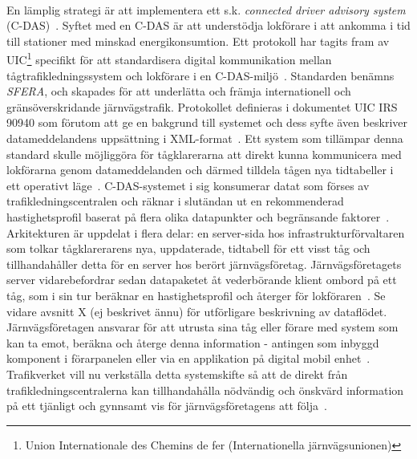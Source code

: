 \paragraph{}
\hspace{-11}En lämplig strategi är att implementera ett s.k. \emph{connected driver advisory system} (C-DAS)~\cite{Angel2020, Joborn2023, Lindmark2022, Ketech2022, Verstappen2022}.
Syftet med en C-DAS är att understödja lokförare i att ankomma i tid till stationer med minskad energikonsumtion\cite{IRS90940}.
Ett protokoll har tagits fram av UIC\footnote{Union Internationale des Chemins de fer (Internationella järnvägsunionen)} specifikt för att standardisera digital kommunikation mellan tågtrafikledningssystem och lokförare i en C-DAS-miljö~\cite{Joborn2023, Olsson2023, Lindmark2022}.
Standarden benämns \emph{SFERA}, och skapades för att underlätta och främja internationell och gränsöverskridande järnvägstrafik\cite{IRS90940}.
Protokollet definieras i dokumentet UIC IRS 90940 som förutom att ge en bakgrund till systemet och dess syfte även beskriver datameddelandens uppsättning i XML-format~\cite{Joborn2023, IRS90940}.
Ett system som tillämpar denna standard skulle möjliggöra för tågklarerarna att direkt kunna kommunicera med lokförarna genom datameddelanden och därmed tilldela tågen nya tidtabeller i ett operativt läge~\cite{Angel2020, Joborn2023, Lindmark2022, Ketech2022, Verstappen2022}.
C-DAS-systemet i sig konsumerar datat som förses av trafikledningscentralen och räknar i slutändan ut en rekommenderad hastighetsprofil baserat på flera olika datapunkter och begränsande faktorer~\cite{Joborn2023, Olsson2023}.
Arkitekturen är uppdelat i flera delar: en server-sida hos infrastrukturförvaltaren som tolkar tågklarerarens nya, uppdaterade, tidtabell för ett visst tåg och tillhandahåller detta för en server hos berört järnvägsföretag.
Järnvägsföretagets server vidarebefordrar sedan datapaketet åt vederbörande klient ombord på ett tåg, som i sin tur beräknar en hastighetsprofil och återger för lokföraren~\cite{Yao2022, Olsson2023, Joborn2023}.
Se vidare avsnitt X (ej beskrivet ännu) för utförligare beskrivning av dataflödet.
Järnvägsföretagen ansvarar för att utrusta sina tåg eller förare med system som kan ta emot, beräkna och återge denna information - antingen som inbyggd komponent i förarpanelen eller via en applikation på digital mobil enhet~\cite{Joborn2023}.
Trafikverket vill nu verkställa detta systemskifte så att de direkt från trafikledningscentralerna kan tillhandahålla nödvändig och önskvärd information på ett tjänligt och gynnsamt vis för järnvägsföretagens att följa~\cite{Angel2020, Joborn2023, Lindmark2022}.
